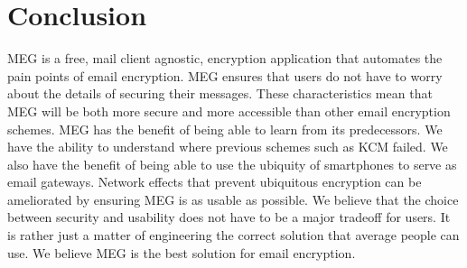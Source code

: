 \documentclass[11pt]{article}
\begin{document}
\section{Conclusion}
\par MEG is a free, mail client agnostic, encryption application that automates the pain points of email encryption. MEG ensures that users do not have to worry about the details of securing their messages. These characteristics mean that MEG will be both more secure and more accessible than other email encryption schemes. MEG has the benefit of being able to learn from its predecessors. We have the ability to understand where previous schemes such as KCM failed. We also have the benefit of being able to use the ubiquity of smartphones to serve as email gateways. Network effects that prevent ubiquitous encryption can be ameliorated by ensuring MEG is as usable as possible. We believe that the choice between security and usability does not have to be a major tradeoff for users. It is rather just a matter of engineering the correct solution that average people can use. We believe MEG is the best solution for email encryption.



\end{document}
